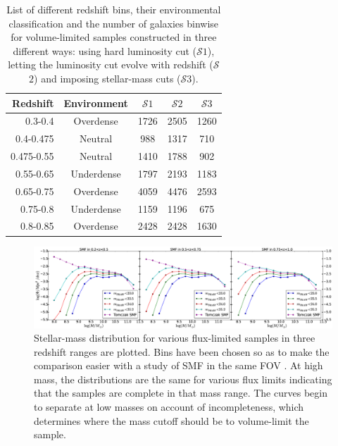 \documentclass[twocolumn,useAMS,usenatbib]{mn2e}
\newcommand{\s}{\ensuremath{\mathcal{S}}}
\begin{document}
\begin{table} 
\centering
\begin{tabular}{|r|c|c|c|c|}
 \hline
 Redshift & Environment & \s$1$ & \s$2$ & \s$3$ \\
 \hline
 0.3-0.4 & Overdense & 1726 & 2505 & 1260 \\
 0.4-0.475 & Neutral & 988 & 1317 & 710 \\
 0.475-0.55 & Neutral & 1410 & 1788 & 902 \\
 0.55-0.65 & Underdense & 1797 & 2193 & 1183 \\
 0.65-0.75 & Overdense & 4059 & 4476 & 2593 \\
 0.75-0.8 & Underdense & 1159 & 1196 & 675 \\
 0.8-0.85 & Overdense & 2428 & 2428 & 1630 \\
\end{tabular}
\caption{List of different redshift bins, their environmental classification and the number of galaxies binwise for volume-limited samples constructed in three different ways: using hard luminosity cut (\s$1$), letting the luminosity cut evolve with redshift (\s$2$) and imposing stellar-mass cuts (\s$3$).}
\label{table:GalaxyCounts}
\end{table}

\begin{figure}
 \centering
 \includegraphics[width=2.4\columnwidth]{SMF}
 \caption{Stellar-mass distribution for various flux-limited samples in three redshift ranges are plotted. Bins have been chosen so as to make the comparison easier with 
          a study of SMF in the same FOV \citep{Tomczak_SMF}. At high mass, the distributions are the same for various flux limits indicating that the samples are complete in that mass range. The curves begin to separate at low masses on account of incompleteness, which determines where the mass cutoff should be to volume-limit the sample.}
 \label{fig:smf}
\end{figure}
\end{document}
